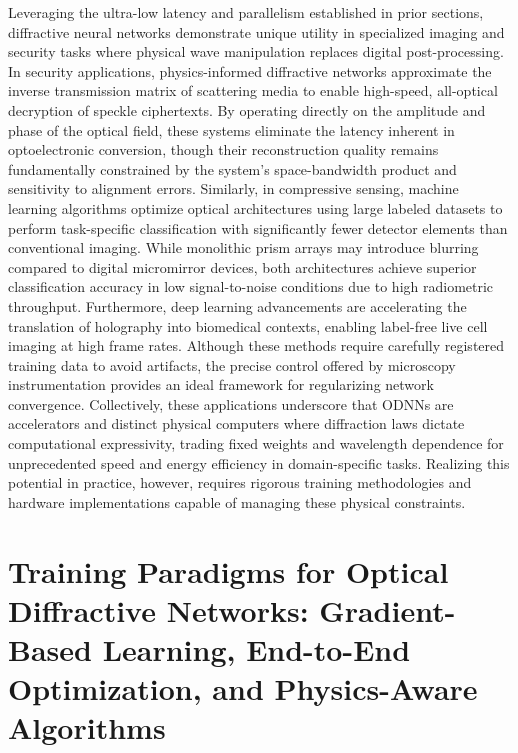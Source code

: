 \documentclass[11pt]{article}
\begin{document}
Leveraging the ultra-low latency and parallelism established in prior sections, diffractive neural networks demonstrate unique utility in specialized imaging and security tasks where physical wave manipulation replaces digital post-processing. In security applications, physics-informed diffractive networks approximate the inverse transmission matrix of scattering media to enable high-speed, all-optical decryption of speckle ciphertexts. By operating directly on the amplitude and phase of the optical field, these systems eliminate the latency inherent in optoelectronic conversion, though their reconstruction quality remains fundamentally constrained by the system's space-bandwidth product and sensitivity to alignment errors. Similarly, in compressive sensing, machine learning algorithms optimize optical architectures using large labeled datasets to perform task-specific classification with significantly fewer detector elements than conventional imaging. While monolithic prism arrays may introduce blurring compared to digital micromirror devices, both architectures achieve superior classification accuracy in low signal-to-noise conditions due to high radiometric throughput. Furthermore, deep learning advancements are accelerating the translation of holography into biomedical contexts, enabling label-free live cell imaging at high frame rates. Although these methods require carefully registered training data to avoid artifacts, the precise control offered by microscopy instrumentation provides an ideal framework for regularizing network convergence. Collectively, these applications underscore that ODNNs are accelerators and distinct physical computers where diffraction laws dictate computational expressivity, trading fixed weights and wavelength dependence for unprecedented speed and energy efficiency in domain-specific tasks. Realizing this potential in practice, however, requires rigorous training methodologies and hardware implementations capable of managing these physical constraints. \citep{doi_10_1117_1_apn_5_1_016010_3e30c230} \citep{doi_10_1117_1_oe_59_5_051404_363a991a} \citep{doi_10_1038_s41377_019_0196_0_c541a42e}

\section{Training Paradigms for Optical Diffractive Networks: Gradient-Based Learning, End-to-End Optimization, and Physics-Aware Algorithms}\label{training-paradigms-for-optical-diffractive-networks-gradient-based-learning-end-to-end-optimization-and-physics-aware-algorithms}
\end{document}
